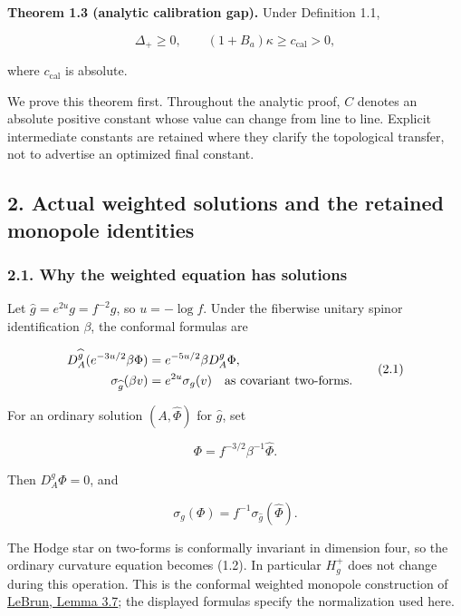 \documentclass[
  10pt,
]{article}
\begin{document}
\textbf{Theorem 1.3 (analytic calibration gap).} Under Definition 1.1,

\[
 \Delta_+\ge0,\qquad (1+B_a)\kappa\ge c_{\mathrm{cal}}>0, \tag{1.8}
\]

where \(c_{\mathrm{cal}}\) is absolute.

We prove this theorem first. Throughout the analytic proof, \(C\)
denotes an absolute positive constant whose value can change from line
to line. Explicit intermediate constants are retained where they clarify
the topological transfer, not to advertise an optimized final constant.

\hypertarget{actual-weighted-solutions-and-the-retained-monopole-identities}{%
\subsection{2. Actual weighted solutions and the retained monopole
identities}\label{actual-weighted-solutions-and-the-retained-monopole-identities}}

\hypertarget{why-the-weighted-equation-has-solutions}{%
\subsubsection{2.1. Why the weighted equation has
solutions}\label{why-the-weighted-equation-has-solutions}}

Let \(\widehat g=e^{2u}g=f^{-2}g\), so \(u=-\log f\). Under the
fiberwise unitary spinor identification \(\beta\), the conformal
formulas are

\[
 \begin{aligned}
 D_A^{\widehat g}(e^{-3u/2}\beta\Phi)
        &=e^{-5u/2}\beta D_A^g\Phi,\\
 \sigma_{\widehat g}(\beta v)&=e^{2u}\sigma_g(v)
                   \quad\hbox{as covariant two-forms}.
 \end{aligned}                                              \tag{2.1}
\]

For an ordinary solution \((A,\widehat\Phi)\) for \(\widehat g\), set

\[
                 \Phi=f^{-3/2}\beta^{-1}\widehat\Phi.
\]

Then \(D_A^g\Phi=0\), and

\[
 \sigma_g(\Phi)=f^{-1}\sigma_{\widehat g}(\widehat\Phi).
\]

The Hodge star on two-forms is conformally invariant in dimension four,
so the ordinary curvature equation becomes (1.2). In particular
\(H_g^+\) does not change during this operation. This is the conformal
weighted monopole construction of
\href{https://arxiv.org/pdf/math/0611450}{LeBrun, Lemma 3.7}; the
displayed formulas specify the normalization used here.
\end{document}

